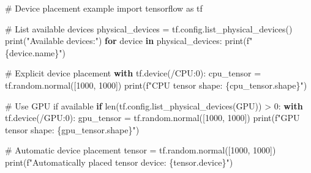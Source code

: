 \documentclass[
  letterpaper,
  DIV=11,
  numbers=noendperiod]{scrreprt}
\newenvironment{Shaded}{\begin{snugshade}}{\end{snugshade}}
\newcommand{\BuiltInTok}[1]{\textcolor[rgb]{0.00,0.23,0.31}{#1}}
\newcommand{\CommentTok}[1]{\textcolor[rgb]{0.37,0.37,0.37}{#1}}
\newcommand{\ControlFlowTok}[1]{\textcolor[rgb]{0.00,0.23,0.31}{\textbf{#1}}}
\newcommand{\DecValTok}[1]{\textcolor[rgb]{0.68,0.00,0.00}{#1}}
\newcommand{\ImportTok}[1]{\textcolor[rgb]{0.00,0.46,0.62}{#1}}
\newcommand{\KeywordTok}[1]{\textcolor[rgb]{0.00,0.23,0.31}{\textbf{#1}}}
\newcommand{\NormalTok}[1]{\textcolor[rgb]{0.00,0.23,0.31}{#1}}
\newcommand{\OperatorTok}[1]{\textcolor[rgb]{0.37,0.37,0.37}{#1}}
\newcommand{\SpecialCharTok}[1]{\textcolor[rgb]{0.37,0.37,0.37}{#1}}
\newcommand{\SpecialStringTok}[1]{\textcolor[rgb]{0.13,0.47,0.30}{#1}}
\newcommand{\StringTok}[1]{\textcolor[rgb]{0.13,0.47,0.30}{#1}}
\begin{document}
\begin{Shaded}
\begin{Highlighting}[]
\CommentTok{\# Device placement example}
\ImportTok{import}\NormalTok{ tensorflow }\ImportTok{as}\NormalTok{ tf}

\CommentTok{\# List available devices}
\NormalTok{physical\_devices }\OperatorTok{=}\NormalTok{ tf.config.list\_physical\_devices()}
\BuiltInTok{print}\NormalTok{(}\StringTok{"Available devices:"}\NormalTok{)}
\ControlFlowTok{for}\NormalTok{ device }\KeywordTok{in}\NormalTok{ physical\_devices:}
    \BuiltInTok{print}\NormalTok{(}\SpecialStringTok{f"  }\SpecialCharTok{\{}\NormalTok{device}\SpecialCharTok{.}\NormalTok{name}\SpecialCharTok{\}}\SpecialStringTok{"}\NormalTok{)}

\CommentTok{\# Explicit device placement}
\ControlFlowTok{with}\NormalTok{ tf.device(}\StringTok{\textquotesingle{}/CPU:0\textquotesingle{}}\NormalTok{):}
\NormalTok{    cpu\_tensor }\OperatorTok{=}\NormalTok{ tf.random.normal([}\DecValTok{1000}\NormalTok{, }\DecValTok{1000}\NormalTok{])}
    \BuiltInTok{print}\NormalTok{(}\SpecialStringTok{f"CPU tensor shape: }\SpecialCharTok{\{}\NormalTok{cpu\_tensor}\SpecialCharTok{.}\NormalTok{shape}\SpecialCharTok{\}}\SpecialStringTok{"}\NormalTok{)}

\CommentTok{\# Use GPU if available}
\ControlFlowTok{if} \BuiltInTok{len}\NormalTok{(tf.config.list\_physical\_devices(}\StringTok{\textquotesingle{}GPU\textquotesingle{}}\NormalTok{)) }\OperatorTok{\textgreater{}} \DecValTok{0}\NormalTok{:}
    \ControlFlowTok{with}\NormalTok{ tf.device(}\StringTok{\textquotesingle{}/GPU:0\textquotesingle{}}\NormalTok{):}
\NormalTok{        gpu\_tensor }\OperatorTok{=}\NormalTok{ tf.random.normal([}\DecValTok{1000}\NormalTok{, }\DecValTok{1000}\NormalTok{])}
        \BuiltInTok{print}\NormalTok{(}\SpecialStringTok{f"GPU tensor shape: }\SpecialCharTok{\{}\NormalTok{gpu\_tensor}\SpecialCharTok{.}\NormalTok{shape}\SpecialCharTok{\}}\SpecialStringTok{"}\NormalTok{)}

\CommentTok{\# Automatic device placement}
\NormalTok{tensor }\OperatorTok{=}\NormalTok{ tf.random.normal([}\DecValTok{1000}\NormalTok{, }\DecValTok{1000}\NormalTok{])}
\BuiltInTok{print}\NormalTok{(}\SpecialStringTok{f"Automatically placed tensor device: }\SpecialCharTok{\{}\NormalTok{tensor}\SpecialCharTok{.}\NormalTok{device}\SpecialCharTok{\}}\SpecialStringTok{"}\NormalTok{)}
\end{Highlighting}
\end{Shaded}
\end{document}
